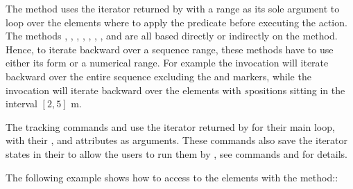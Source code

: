 \documentclass[letterpaper,10pt,english]{sphinxmanual}
\begin{document}
\sphinxAtStartPar
The method  uses the iterator returned by  with a range as its sole argument to loop over the elements where to apply the predicate before
executing the action. The methods , , , , , , , and  are all based
directly or indirectly on the  method. Hence, to iterate backward over a sequence range, these methods have to use either its  form or a numerical range.
For example the invocation  will iterate backward over the entire sequence  excluding the 
and  markers, while the invocation  will iterate backward over the elements with \(s\)\sphinxhyphen{}positions sitting in the
interval \([2,5]\) m.

\sphinxAtStartPar
The tracking commands  and  use the iterator returned by  for their main loop, with their ,  and  attributes
as arguments. These commands also save the iterator states in their  to allow the users to run them  by , see commands {\hyperref[\detokenize{survey::doc}]{}}
and {\hyperref[\detokenize{track::doc}]{}} for details.

\sphinxAtStartPar
The following example shows how to access to the elements with the  method::
\end{document}
